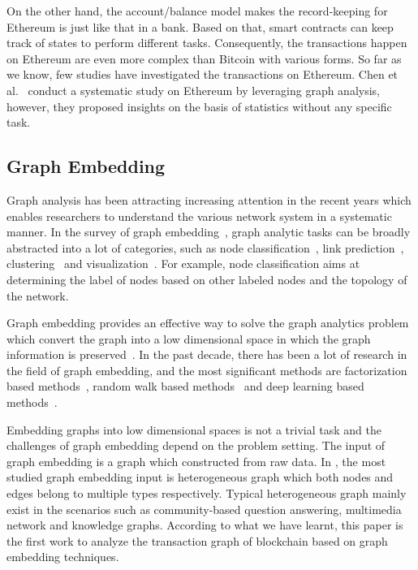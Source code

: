 On the other hand, the account/balance model makes the record-keeping for Ethereum is just like that in a bank. Based on that, smart contracts can keep track of states to perform different tasks. Consequently, the transactions happen on Ethereum are even more complex than Bitcoin with various forms. So far as we know, few studies have investigated the transactions on Ethereum. Chen et al.~\cite{chen2018infocom} conduct a systematic study on Ethereum by leveraging graph analysis, however, they proposed insights on the basis of statistics without any specific task. 

 


\subsection{Graph Embedding}
Graph analysis has been attracting increasing attention in the recent years which enables researchers to understand the various network system in a systematic manner. In the survey of graph embedding~\cite{cai2018comprehensive}, graph analytic tasks can be broadly abstracted into a lot of categories, such as node classification~\cite{bhagat2011node}, link prediction~\cite{liben2007link}, clustering~\cite{ding2001min} and visualization~\cite{maaten2008visualizing}. For example, node classification aims at determining the label of nodes based on other labeled nodes and the topology of the network.

Graph embedding provides an effective way to solve the graph analytics problem which convert the graph into a low dimensional space in which the graph information is preserved~\cite{hamilton2017representation}. In the past decade, there has been a lot of research in the field of graph embedding, and the most significant methods are factorization based methods~\cite{ahmed2013distributed,belkin2002laplacian,roweis2000nonlinear}, random walk based methods~\cite{perozzi2014deepwalk,grover2016node2vec} and deep learning based methods~\cite{wang2016structural,kipf2016semi}. 

Embedding graphs into low dimensional spaces is not a trivial task and the challenges of graph embedding depend on the problem setting. The input of graph embedding is a graph which constructed from raw data. In \cite{goyal2018graph}, the most studied graph embedding input is heterogeneous graph which both nodes and edges belong to multiple types respectively. Typical heterogeneous graph mainly exist in the scenarios such as community-based question answering, multimedia network and knowledge graphs. According to what we have learnt, this paper is the first work to analyze the transaction graph of blockchain based on graph embedding techniques.